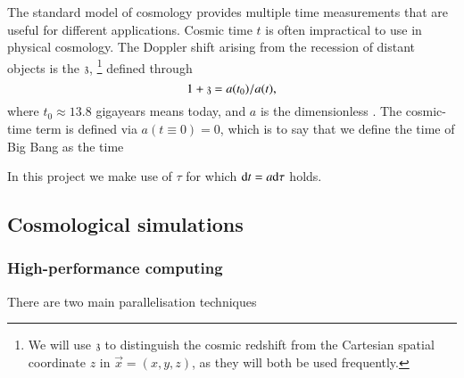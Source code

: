 

    The standard model of cosmology provides multiple time measurements that are useful for different applications. 
    Cosmic time $t$ is often impractical to use in physical cosmology. The Doppler shift arising from the recession of distant objects is the  $\mathfrak{z}$,%
    \footnote{
        We will use $\mathfrak{z}$ to distinguish the cosmic redshift from the Cartesian spatial coordinate $z$ in $\vec{x}=(x,y,z)$, as they will both be used frequently.
    } %
    defined through
    \begin{equation}
        1 + \mathfrak{z} = a(t_0)/a(t),
    \end{equation}
    where $t_0\approx 13.8$ gigayears means today, and $a$ is the dimensionless . The cosmic-time term is defined via $a(t\equiv 0)= 0$, which is to say that we define the time of Big Bang as the time \blahblah {}
    
    In this project we make use of  $\tau$ for which ${\diff t} = a {\diff \tau}$ holds.  



\subsection{Cosmological simulations}

    

    \subsubsection{High-performance computing}

    There are two main parallelisation techniques \blahblah
    
    

    

    
    

